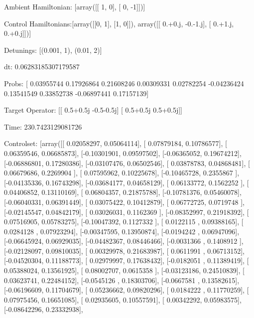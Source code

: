 \documentclass{article}
\begin{document}
    

\newpage

Ambient Hamiltonian: [array([[ 1,  0],
       [ 0, -1]])]

Control Hamiltonians:[array([[0, 1],
       [1, 0]]), array([[ 0.+0.j, -0.-1.j],
       [ 0.+1.j,  0.+0.j]])]

Detunings: [(0.001, 1), (0.01, 2)]

 dt: 0.06283185307179587

Probs: [ 0.03955744  0.17926864  0.21608246  0.00309331  0.02782254 -0.04236424
  0.13541549  0.33852738 -0.06897441  0.17157139]

Target Operator: [[ 0.5+0.5j -0.5-0.5j]
 [ 0.5+0.5j  0.5+0.5j]]

Time: 230.7423129081726

Controlset: [array([[ 0.02058297,  0.05064114],
       [ 0.07879184,  0.10786577],
       [ 0.06359546,  0.06685873],
       [-0.10301901,  0.09597502],
       [-0.06365052,  0.19674212],
       [-0.06886801,  0.17280386],
       [-0.03107476,  0.06502546],
       [ 0.03878783,  0.04868481],
       [ 0.06679686,  0.2269904 ],
       [ 0.07595962,  0.10225678],
       [-0.10465728,  0.2355867 ],
       [-0.04135336,  0.16743298],
       [-0.03684177,  0.04658129],
       [ 0.06133772,  0.1562252 ],
       [ 0.04406852,  0.13110169],
       [ 0.06804357,  0.21875788],
       [-0.10781376,  0.05460078],
       [-0.06040331,  0.06391449],
       [ 0.03075422,  0.10412879],
       [ 0.06772725,  0.0719748 ],
       [-0.02145547,  0.04842179],
       [ 0.03026031,  0.1162369 ],
       [-0.08352997,  0.21918392],
       [ 0.07516905,  0.05783275],
       [-0.10047392,  0.1127332 ],
       [ 0.0122115 ,  0.09388165],
       [ 0.0284128 ,  0.07923294],
       [-0.00347595,  0.13950874],
       [-0.0194242 ,  0.06947096],
       [-0.06645924,  0.06929035],
       [-0.04482367,  0.08446466],
       [-0.0031366 ,  0.1408912 ],
       [-0.02128097,  0.09810035],
       [ 0.00329978,  0.21683987],
       [ 0.0611991 ,  0.06713152],
       [-0.04520304,  0.11188773],
       [ 0.02979997,  0.17638432],
       [-0.0182051 ,  0.11389419],
       [ 0.05388024,  0.13561925],
       [ 0.08002707,  0.0615358 ],
       [-0.03123186,  0.24510839],
       [ 0.03623741,  0.22484152],
       [-0.0545126 ,  0.18303706],
       [-0.0667581 ,  0.13582615],
       [-0.06196609,  0.11704679],
       [ 0.05236662,  0.09820296],
       [ 0.0184222 ,  0.11770259],
       [ 0.07975456,  0.16651085],
       [ 0.02935605,  0.10557591],
       [ 0.00342292,  0.05983575],
       [-0.08642296,  0.23332938],
\end{document}
